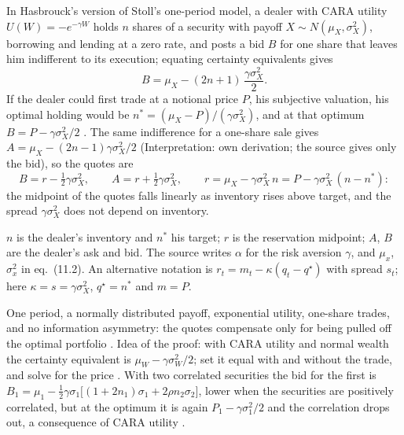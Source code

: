 \begin{qfmodel}\label{mod:inventory-based-quotes}
 In Hasbrouck's version of Stoll's one-period model, a dealer with CARA utility $U(W)=-e^{-\gamma W}$ holds $n$ shares of a security with payoff $X\sim N(\mu_X,\sigma_X^2)$, borrowing and lending at a zero rate, and posts a bid $B$ for one share that leaves him indifferent to its execution; equating certainty equivalents gives \citep[sec.~11.2, eq.~(11.2), p.~110]{s6-hasbrouck}
\[ B=\mu_X-(2n+1)\,\frac{\gamma\sigma_X^2}{2}. \]
If the dealer could first trade at a notional price $P$, his subjective valuation, his optimal holding would be $n^\ast=(\mu_X-P)/(\gamma\sigma_X^2)$, and at that optimum $B=P-\gamma\sigma_X^2/2$ \citep[same sec., pp.~110--111]{s6-hasbrouck}. The same indifference for a one-share sale gives $A=\mu_X-(2n-1)\gamma\sigma_X^2/2$ (Interpretation: own derivation; the source gives only the bid), so the quotes are
\[ B=r-\tfrac12\gamma\sigma_X^2, \qquad A=r+\tfrac12\gamma\sigma_X^2, \qquad r=\mu_X-\gamma\sigma_X^2\,n=P-\gamma\sigma_X^2\,(n-n^\ast): \]
the midpoint of the quotes falls linearly as inventory rises above target, and the spread $\gamma\sigma_X^2$ does not depend on inventory.

 $n$ is the dealer's inventory and $n^\ast$ his target; $r$ is the reservation midpoint; $A$, $B$ are the dealer's ask and bid. The source writes $\alpha$ for the risk aversion $\gamma$, and $\mu_x$, $\sigma_x^2$ in eq.~(11.2). An alternative notation is $r_t=m_t-\kappa(q_t-q^\star)$ with spread $s_t$; here $\kappa=s=\gamma\sigma_X^2$, $q^\star=n^\ast$ and $m=P$.

 One period, a normally distributed payoff, exponential utility, one-share trades, and no information asymmetry: the quotes compensate only for being pulled off the optimal portfolio \citep[same sec., p.~110]{s6-hasbrouck}. Idea of the proof: with CARA utility and normal wealth the certainty equivalent is $\mu_W-\gamma\sigma_W^2/2$; set it equal with and without the trade, and solve for the price \citep[same sec., p.~110]{s6-hasbrouck}. With two correlated securities the bid for the first is $B_1=\mu_1-\tfrac12\gamma\sigma_1\big[(1+2n_1)\sigma_1+2\rho n_2\sigma_2\big]$, lower when the securities are positively correlated, but at the optimum it is again $P_1-\gamma\sigma_1^2/2$ and the correlation drops out, a consequence of CARA utility \citep[same sec., eq.~(11.3), p.~111]{s6-hasbrouck}.


\end{qfmodel}
